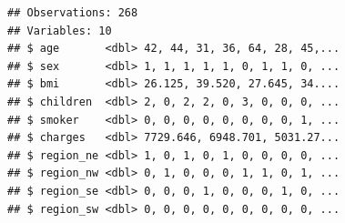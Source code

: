 \documentclass[openany]{book}
\newenvironment{Shaded}{\begin{snugshade}}{\end{snugshade}}
\newcommand{\DataTypeTok}[1]{\textcolor[rgb]{0.13,0.29,0.53}{#1}}
\newcommand{\DecValTok}[1]{\textcolor[rgb]{0.00,0.00,0.81}{#1}}
\newcommand{\FloatTok}[1]{\textcolor[rgb]{0.00,0.00,0.81}{#1}}
\newcommand{\KeywordTok}[1]{\textcolor[rgb]{0.13,0.29,0.53}{\textbf{#1}}}
\newcommand{\NormalTok}[1]{#1}
\newcommand{\OperatorTok}[1]{\textcolor[rgb]{0.81,0.36,0.00}{\textbf{#1}}}
\newcommand{\StringTok}[1]{\textcolor[rgb]{0.31,0.60,0.02}{#1}}
\begin{document}
\begin{Shaded}
\end{Shaded}

\begin{verbatim}
## Observations: 268
## Variables: 10
## $ age       <dbl> 42, 44, 31, 36, 64, 28, 45,...
## $ sex       <dbl> 1, 1, 1, 1, 1, 0, 1, 1, 0, ...
## $ bmi       <dbl> 26.125, 39.520, 27.645, 34....
## $ children  <dbl> 2, 0, 2, 2, 0, 3, 0, 0, 0, ...
## $ smoker    <dbl> 0, 0, 0, 0, 0, 0, 0, 0, 1, ...
## $ charges   <dbl> 7729.646, 6948.701, 5031.27...
## $ region_ne <dbl> 1, 0, 1, 0, 1, 0, 0, 0, 0, ...
## $ region_nw <dbl> 0, 1, 0, 0, 0, 1, 1, 0, 1, ...
## $ region_se <dbl> 0, 0, 0, 1, 0, 0, 0, 1, 0, ...
## $ region_sw <dbl> 0, 0, 0, 0, 0, 0, 0, 0, 0, ...
\end{verbatim}
\end{document}

